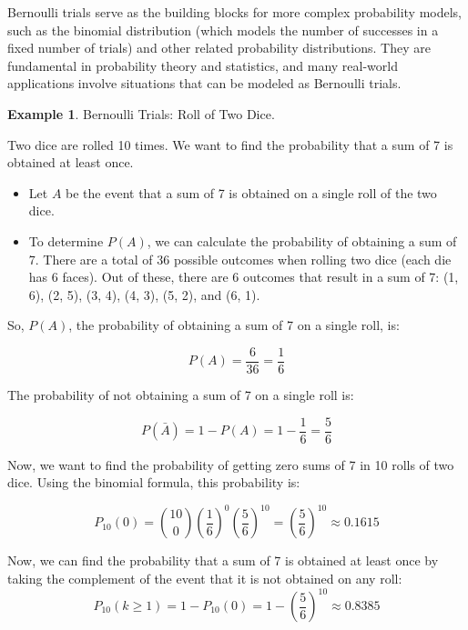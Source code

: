 \documentclass[12pt]{book}
\theoremstyle{definition}
\newtheorem{exmp}{Example}[chapter]
\begin{document}
Bernoulli trials serve as the building blocks for more complex probability models, such as the binomial distribution (which models the number of successes in a fixed number of trials) and other related probability distributions. They are fundamental in probability theory and statistics, and many real-world applications involve situations that can be modeled as Bernoulli trials.

\newpage


\begin{tcolorbox}
\begin{exmp}{Bernoulli Trials: Roll of Two Dice.}

Two dice are rolled 10 times. We want to find the probability that a sum of 7 is obtained at least once.

\end{exmp}
\end{tcolorbox}


\begin{itemize}
    \item Let \(A\) be the event that a sum of 7 is obtained on a single roll of the two dice. 
    \item To determine \(P(A)\), we can calculate the probability of obtaining a sum of 7. There are a total of 36 possible outcomes when rolling two dice (each die has 6 faces). Out of these, there are 6 outcomes that result in a sum of 7: (1, 6), (2, 5), (3, 4), (4, 3), (5, 2), and (6, 1).
\end{itemize}

So, \(P(A)\), the probability of obtaining a sum of 7 on a single roll, is:

\[
P(A) = \frac{6}{36} = \frac{1}{6}
\]

The probability of not obtaining a sum of 7 on a single roll is:

\[
P(\bar A) = 1 - P(A) = 1 - \frac{1}{6} = \frac{5}{6}
\]


Now, we want to find the probability of getting zero sums of 7 in 10 rolls of two dice. Using the binomial formula, this probability is:

\[
P_{10}(0) = \binom{10}{0} \left(\frac{1}{6}\right)^0 \left(\frac{5}{6}\right)^{10} = \left(\frac{5}{6}\right)^{10}
\approx 0.1615\]

Now, we can find the probability that a sum of 7 is obtained at least once by taking the complement of the event that it is not obtained on any roll:
\[
P_{10}(k\ge1) = 1 - P_{10}(0) = 1 - \left(\frac{5}{6}\right) ^{10}
 \approx 0.8385\]
\end{document}
